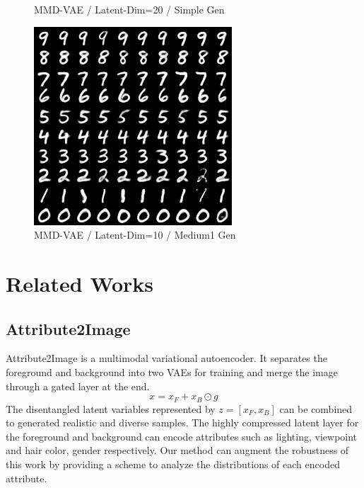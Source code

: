 \documentclass{article}
\begin{document}
\begin{figure}[htb]
  \caption{MMD-VAE / Latent-Dim=20 / Simple Gen}\label{fig:mmd_20_simple}
\endminipage\hfill
{}%
   \includegraphics[width=\linewidth]{assets/mmd_10_medium.png}
  \caption{MMD-VAE / Latent-Dim=10 / Medium1 Gen}\label{fig:mmd_10_medium}
\endminipage
\end{figure}
\section{Related Works}
\subsection{Attribute2Image}

Attribute2Image is a multimodal variational autoencoder. It separates the foreground and background into two VAEs for training and merge the image through a gated layer at the end. 
\begin{equation} 
x=x_F + x_B \odot g
\end{equation}
The disentangled latent variables represented by $z=[x_F, x_B]$ can be combined to generated realistic and diverse samples. The highly compressed latent layer for the foreground and background can encode attributes such as lighting, viewpoint and hair color, gender respectively. Our method can augment the robustness of this work by providing a scheme to analyze the distributions of each encoded attribute.
\end{document}
